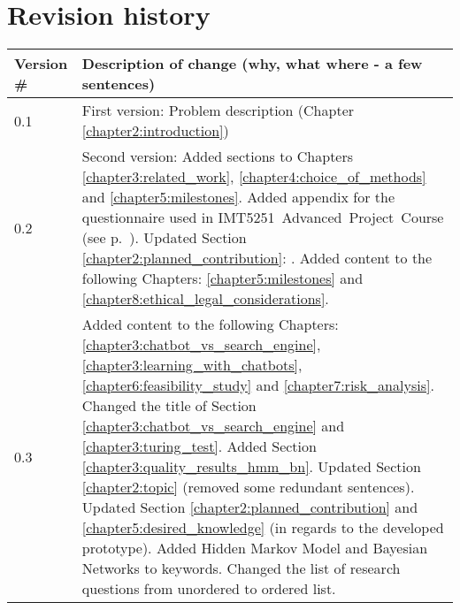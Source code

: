 \chapter*{Revision history}

\begin{center}
	\begin{tabular}[H]{|l|p{35em}|}
		\hline
		Version \#  & Description of change (why, what where - a few sentences)\\
		\hline
		0.1   & First version: Problem description (Chapter \ref{chapter2:introduction})\\
		\hline
		0.2   & Second version: Added sections to Chapters \ref{chapter3:related_work}, \ref{chapter4:choice_of_methods} and \ref{chapter5:milestones}. 
		\newline  
		Added appendix for the questionnaire used in \newline IMT5251~Advanced~Project~Course (see p.~\pageref{appendix:questionnaire}).
		\newline  
		Updated Section \ref{chapter2:planned_contribution}: \nameref{chapter2:planned_contribution}.
		\newline  
		Added content to the following Chapters: \ref{chapter5:milestones} and \ref{chapter8:ethical_legal_considerations}. \\
		\hline
		0.3   & Added content to the following Chapters: \ref{chapter3:chatbot_vs_search_engine}, \ref{chapter3:learning_with_chatbots}, 
		\ref{chapter6:feasibility_study} and \ref{chapter7:risk_analysis}. \newline
		Changed the title of Section \ref{chapter3:chatbot_vs_search_engine} and \ref{chapter3:turing_test}. 
		Added Section \ref{chapter3:quality_results_hmm_bn}. \newline
		Updated Section \ref{chapter2:topic} (removed some redundant sentences). \newline
		Updated Section \ref{chapter2:planned_contribution} and \ref{chapter5:desired_knowledge} (in regards to the developed prototype). \newline
		Added Hidden Markov Model and Bayesian Networks to keywords. \newline
		Changed the list of research questions from unordered to ordered list.		
		\\		
		\hline
	\end{tabular}
\end{center}
